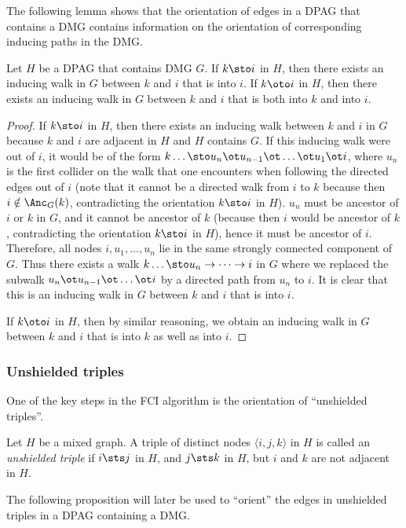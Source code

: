 The following lemma shows that the orientation of edges in a DPAG that contains a DMG contains
information on the orientation of corresponding inducing paths in the DMG.
\begin{Lem}\label{lemm:inducing_walk_into}
  Let $H$ be a DPAG that contains DMG $G$. 
  If $k \sto i$ in $H$, then there exists an inducing walk in $G$ between $k$ and $i$ that is into $i$.
  If $k \oto i$ in $H$, then there exists an inducing walk in $G$ between $k$ and $i$ that is both into $k$ and into $i$.
\end{Lem}
\begin{proof}
  If $k \sto i$ in $H$, then there %
  exists an inducing walk between $k$ and $i$ in $G$ because $k$ and $i$ are adjacent in $H$ and $H$ contains $G$.
  If this inducing walk were out of $i$, it would be of the form $k \ldots \sto u_n \ot u_{n-1} \ot \dots \ot u_1 \ot i$, where $u_n$ is the first collider on the walk that one encounters when following the directed edges out of $i$ (note that it cannot be a directed walk from $i$ to $k$ because then $i \notin \Anc_G(k)$, contradicting the orientation $k \sto i$ in $H$).
  $u_n$ must be ancestor of $i$ or $k$ in $G$, and it cannot be ancestor of $k$ (because then $i$ would be ancestor of $k$, contradicting the orientation $k \sto i$ in $H$), hence it must be ancestor of $i$.
  Therefore, all nodes $i, u_1, \dots, u_n$ lie in the same strongly connected component of $G$.
  Thus there exists a walk $k \ldots \sto u_n \to \dots \to i$ in $G$ where we replaced the subwalk $u_n \ot u_{n-1} \ot \dots \ot i$ by a directed path from $u_n$ to $i$. 
  It is clear that this is an inducing walk in $G$ between $k$ and $i$ that is into $i$.

  If $k \oto i$ in $H$, then by similar reasoning, we obtain an inducing walk in $G$ between $k$ and $i$ that is into $k$ as well as into $i$.
\end{proof}

\subsubsection{Unshielded triples}

One of the key steps in the FCI algorithm is the orientation of ``unshielded triples''.
\begin{Def}
  Let $H$ be a mixed graph. A triple of distinct nodes $\langle i,j,k \rangle$ in $H$ is called
  an \emph{unshielded triple} if $i \sts j$ in $H$, and $j \sts k$ in $H$, but
  $i$ and $k$ are not adjacent in $H$.
\end{Def}
The following proposition will later be used to ``orient'' the edges in unshielded triples
in a DPAG containing a DMG.

